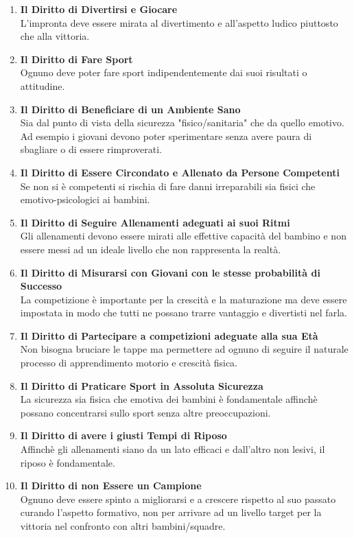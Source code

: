 \documentclass[../uefaC.tex]{subfiles}
\begin{document}
\begin{enumerate}
    \item{\textbf{Il Diritto di Divertirsi e Giocare}} \\L'impronta deve essere mirata al divertimento e all'aspetto ludico piuttosto che alla vittoria.
    \item{\textbf{Il Diritto di Fare Sport}} \\ Ognuno deve poter fare sport indipendentemente dai suoi risultati o attitudine.
    \item{\textbf{Il Diritto di Beneficiare di un Ambiente Sano}} \\Sia dal punto di vista della sicurezza "fisico/sanitaria" che da quello emotivo. Ad esempio i giovani devono poter sperimentare senza avere paura di sbagliare o di essere rimproverati.
    \item{\textbf{Il Diritto di Essere Circondato e Allenato da Persone Competenti}} \\Se non si è competenti si rischia di fare danni irreparabili sia fisici che emotivo-psicologici ai bambini.
    \item{\textbf{Il Diritto di Seguire Allenamenti adeguati ai suoi Ritmi}} \\Gli allenamenti devono essere mirati alle effettive capacità del bambino e non essere messi ad un ideale livello che non rappresenta la realtà.
    \item{\textbf{Il Diritto di Misurarsi con Giovani con le stesse probabilità di Successo}} \\La competizione è importante per la crescità e la maturazione ma deve essere impostata in modo che tutti ne possano trarre vantaggio e divertisti nel farla.
    \item{\textbf{Il Diritto di Partecipare a competizioni adeguate alla sua Età}} \\Non bisogna bruciare le tappe ma permettere ad ognuno di seguire il naturale processo di apprendimento motorio e crescità fisica.
    \item{\textbf{Il Diritto di Praticare Sport in Assoluta Sicurezza}} \\La sicurezza sia fisica che emotiva dei bambini è fondamentale affinchè possano concentrarsi sullo sport senza altre preoccupazioni.
    \item{\textbf{Il Diritto di avere i giusti Tempi di Riposo}} \\Affinchè gli allenamenti siano da un lato efficaci e dall'altro non lesivi, il riposo è fondamentale.
    \item{\textbf{Il Diritto di non Essere un Campione}} \\Ognuno deve essere spinto a migliorarsi e a crescere rispetto al suo passato curando l'aspetto formativo, non per arrivare ad un livello target per la vittoria nel confronto con altri bambini/squadre.
\end{enumerate}
\hfill \\
\end{document}
